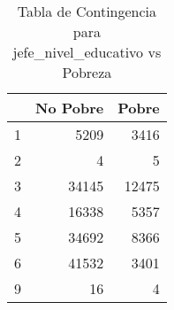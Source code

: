 \begin{table}[ht]
\centering
\begin{tabular}{rrr}
  \toprule
 & No Pobre & Pobre \\ 
  \midrule
1 & 5209 & 3416 \\ 
  2 &   4 &   5 \\ 
  3 & 34145 & 12475 \\ 
  4 & 16338 & 5357 \\ 
  5 & 34692 & 8366 \\ 
  6 & 41532 & 3401 \\ 
  9 &  16 &   4 \\ 
   \bottomrule
\end{tabular}
\caption{Tabla de Contingencia para jefe_nivel_educativo vs Pobreza} 
\label{tab:contingency_jefe_nivel_educativo}
\end{table}
